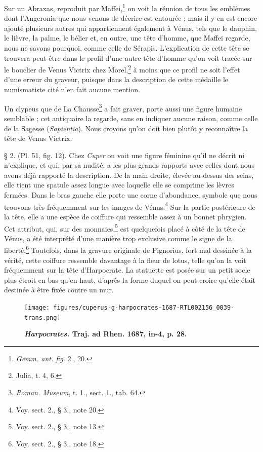 \documentclass[a4paper, 11pt, oneside, polutonikogreek, french]{article}
\begin{document}
Sur un Abraxas, reproduit par Maffei,\footnote{\emph{Gemm. ant. fig.} 2., 20.} on voit la réunion de tous les emblèmes dont l'Angeronia que nous venons de décrire est entourée ; mais il y en est encore ajouté plusieurs autres qui appartiennent également à Vénus, tels que le dauphin, le lièvre, la palme, le bélier et, en outre, une tête d'homme, que Maffei regarde, nous ne savons pourquoi, comme celle de Sérapis. L'explication de cette tête se trouvera peut-être dans le profil d'une autre tête d'homme qu'on voit tracée sur le bouclier de Venus Victrix chez Morel,\footnote{Julia, t. 4, 6.} à moins que ce profil ne soit l'effet d'une erreur du graveur, puisque dans la description de cette médaille le numismatiste cité n'en fait aucune mention.

Un clypeus que de La Chausse\footnote{\emph{Roman. Museum}, t. 1., sect. 1., tab. 64.} a fait graver, porte aussi une figure humaine semblable ; cet antiquaire la regarde, sans en indiquer aucune raison, comme celle de la Sagesse (\emph{Sapientia}). Nous croyons qu'on doit bien plutôt y reconnaître la tête de Venus Victrix.

§ 2. (Pl. 51, fig. 12). Chez \emph{Cuper} on voit une figure féminine qu'il ne décrit ni n'explique, et qui, par sa nudité, a les plus grands rapports avec celles dont nous avons déjà rapporté la description. De la main droite, élevée au-dessus des seins, elle tient une spatule assez longue avec laquelle elle se comprime les lèvres fermées. Dans le bras gauche elle porte une corne d'abondance, symbole que nous trouvons très-fréquemment sur les images de Vénus.\footnote{Voy. sect. 2., § 3., note 20.} Sur la partie postérieure de la tête, elle a une espèce de coiffure qui ressemble assez à un bonnet phrygien. Cet attribut, qui, sur des monnaies,\footnote{Voy. sect. 2., § 3., note 13.} est quelquefois placé à côté de la tête de Vénus, a été interprété d'une manière trop exclusive comme le signe de la liberté.\footnote{Voy. sect. 2., § 3., note 18.} Toutefois, dans la gravure originale de Pignorius, fort mal dessinée à la vérité, cette coiffure ressemble davantage à la fleur de lotus, telle qu'on la voit fréquemment sur la tête d'Harpocrate. La statuette est posée sur un petit socle plus étroit en bas qu'en haut, d'après la forme duquel on peut croire qu'elle était destinée à être fixée contre un mur.

\begin{figure}[H]
\centering
\texttt{[image: figures/cuperus-g-harpocrates-1687-RTL002156\_0039-trans.png]}
\caption{\bfseries \emph{Harpocrates.} Traj. ad Rhen. 1687, in-4, p. 28.}
\end{figure}
\end{document}
